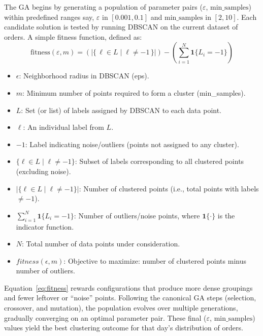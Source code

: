 The GA begins by generating a population of parameter pairs ($\varepsilon$, $\text{min\_samples}$) within predefined ranges say, $\varepsilon$ in $[0.001, 0.1]$ and $\text{min\_samples}$ in $[2, 10]$. Each candidate solution is tested by running DBSCAN on the current dataset of orders. A simple fitness function, defined as:
\begin{equation}
    \text{fitness}(\varepsilon, m) = \left( |\{\, \ell \in L \mid \ell \neq -1 \,\}| \right) - \left( \sum_{i=1}^{N} \mathbf{1}\{L_i = -1\} \right)
    \label{eq:fitness}
\end{equation}

\begin{itemize}
    \item \textbf{$\epsilon$}: Neighborhood radius in DBSCAN (eps).
    \item \textbf{$m$}: Minimum number of points required to form a cluster (min\_samples).
    \item \textbf{$L$}: Set (or list) of labels assigned by DBSCAN to each data point.
    \item \textbf{$\ell$}: An individual label from $L$.
    \item \textbf{$-1$}: Label indicating noise/outliers (points not assigned to any cluster).
    \item \textbf{$\{\ell \in L \mid \ell \neq -1\}$}: Subset of labels corresponding to all clustered points (excluding noise).
    \item \textbf{$\bigl|\{\ell \in L \mid \ell \neq -1\}\bigr|$}: Number of clustered points (i.e., total points with labels $\neq -1$).
    \item \textbf{$\sum_{i=1}^{N} \mathbf{1}\{L_i = -1\}$}: Number of outliers/noise points, where $\mathbf{1}\{\cdot\}$ is the indicator function.
    \item \textbf{$N$}: Total number of data points under consideration.
    \item \textbf{$fitness(\epsilon, m)$}: Objective to maximize: number of clustered points minus number of outliers.
\end{itemize}

Equation~\ref{eq:fitness} rewards configurations that produce more dense groupings and fewer leftover or ``noise'' points. Following the canonical GA steps (selection, crossover, and mutation), the population evolves over multiple generations, gradually converging on an optimal parameter pair. These final ($\varepsilon$, $\text{min\_samples}$) values yield the best clustering outcome for that day's distribution of orders.


